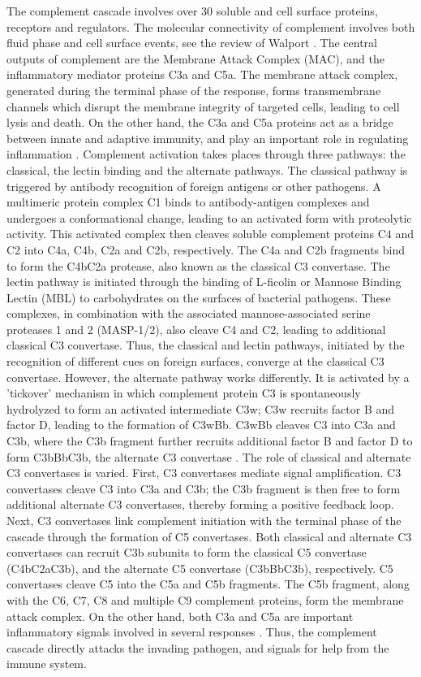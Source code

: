 \documentclass[12pt]{article}
\begin{document}
The complement cascade involves over 30 soluble and cell surface proteins, receptors and regulators.
The molecular connectivity of complement involves both fluid phase and cell surface events, see the review of Walport \cite{Walport:2001ab,Walport:2001aa}.
The central outputs of complement are the Membrane Attack Complex (MAC), and the inflammatory mediator proteins C3a and C5a.
The membrane attack complex, generated during the terminal phase of the response,
forms transmembrane channels which disrupt the membrane integrity of targeted cells, leading to cell lysis and death.
On the other hand, the C3a and C5a proteins act as a bridge between innate and adaptive immunity, and play an important role in regulating inflammation \cite{sarma2011complement}.
Complement activation takes places through three pathways: the classical, the lectin binding and the alternate pathways.
The classical pathway is triggered by antibody recognition of foreign antigens or other pathogens.
A multimeric protein complex C1 binds to antibody-antigen complexes and undergoes a conformational change, leading to an activated form with proteolytic activity.
This activated complex then cleaves soluble complement proteins C4 and C2 into C4a, C4b, C2a and C2b, respectively.
The C4a and C2b fragments bind to form the C4bC2a protease, also known as the classical C3 convertase.
The lectin pathway is initiated through the binding of L-ficolin or Mannose Binding Lectin (MBL) to carbohydrates on the surfaces of bacterial pathogens.
These complexes, in combination with the associated mannose-associated serine proteases
1 and 2 (MASP-1/2), also cleave C4 and C2, leading to additional classical C3 convertase.
Thus, the classical and lectin pathways, initiated by the recognition of different cues on foreign surfaces,  converge at the classical C3 convertase.
However, the alternate pathway works differently. It is activated by a 'tickover' mechanism in which complement protein C3 is spontaneously hydrolyzed to form an activated intermediate C3w;
C3w recruits factor B and factor D, leading to the formation of C3wBb. C3wBb cleaves C3 into C3a and C3b, where
the C3b fragment further recruits additional factor B and factor D to form C3bBbC3b, the alternate C3 convertase \cite{pangburn1984alternative}.
The role of classical and alternate C3 convertases is varied.
First, C3 convertases mediate signal amplification.
C3 convertases cleave C3 into C3a and C3b; the C3b fragment is then free to form additional alternate C3 convertases,
thereby forming a positive feedback loop.
Next, C3 convertases link complement initiation with the terminal phase of the cascade through the formation of C5 convertases.
Both classical and alternate C3 convertases can recruit C3b subunits to form the classical C5 convertase (C4bC2aC3b), and the alternate C5 convertase (C3bBbC3b), respectively.
C5 convertases cleave C5 into the C5a and C5b fragments.
The C5b fragment, along with the C6, C7, C8 and multiple C9 complement proteins, form the membrane attack complex.
On the other hand, both C3a and C5a are important inflammatory signals involved in several responses \cite{Walport:2001ab,Walport:2001aa}.
Thus, the complement cascade directly attacks the invading pathogen, and signals for help from the immune system.
\end{document}
